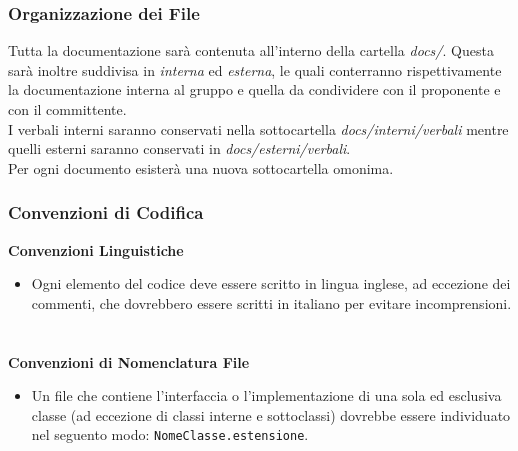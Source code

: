 \documentclass[a4paper, 12pt]{article}
\begin{document}
\subsubsection{Organizzazione dei File}
Tutta la documentazione sarà contenuta all'interno della cartella \textit{docs/}. Questa sarà inoltre suddivisa in \textit{interna} ed \textit{esterna}, le quali conterranno rispettivamente la documentazione interna al gruppo e quella da condividere con il proponente e con il committente. \\
I verbali interni saranno conservati nella sottocartella \textit{docs/interni/verbali} mentre quelli esterni saranno conservati in \textit{docs/esterni/verbali}.\\
Per ogni documento esisterà una nuova sottocartella omonima.

\subsubsection{Convenzioni di Codifica}
\textbf{Convenzioni Linguistiche} \newline
\begin{itemize}
    \item Ogni elemento del codice deve essere scritto in lingua inglese, ad eccezione dei commenti, che dovrebbero essere scritti in italiano per evitare incomprensioni.
\end{itemize}
\paragraph{}\\
\textbf{Convenzioni di Nomenclatura File}
\begin{itemize}
    \item Un file che contiene l'interfaccia o l'implementazione di una sola ed esclusiva classe (ad eccezione di classi interne e sottoclassi) dovrebbe essere individuato nel seguento modo: \texttt{NomeClasse.estensione}.
\end{itemize}
\end{document}
